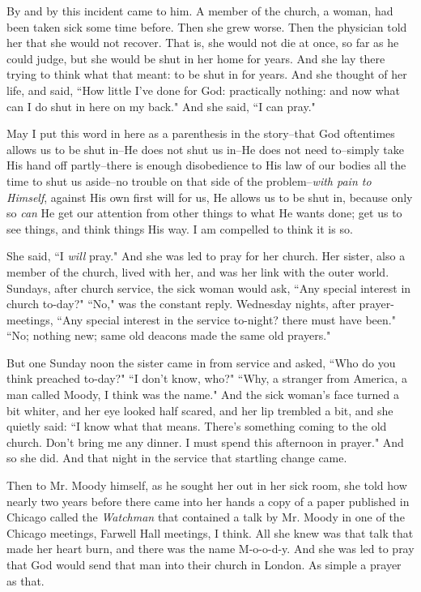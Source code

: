 By and by this incident came to him. A member of the church, a woman, had
been taken sick some time before. Then she grew worse. Then the physician
told her that she would not recover. That is, she would not die at once,
so far as he could judge, but she would be shut in her home for years.
And she lay there trying to think what that meant: to be shut in for
years. And she thought of her life, and said, ``How little I've done for
God: practically nothing: and now what can I do shut in here on my back."
And she said, ``I can pray."

May I put this word in here as a parenthesis in the story--that God
oftentimes allows us to be shut in--He does not shut us in--He does not
need to--simply take His hand off partly--there is enough disobedience to
His law of our bodies all the time to shut us aside--no trouble on that
side of the problem--\textit{with pain to Himself}, against His own first will
for us, He allows us to be shut in, because only so \textit{can} He get our
attention from other things to what He wants done; get us to see things,
and think things His way. I am compelled to think it is so.

She said, ``I \textit{will} pray." And she was led to pray for her church. Her
sister, also a member of the church, lived with her, and was her link with
the outer world. Sundays, after church service, the sick woman would ask,
``Any special interest in church to-day?" ``No," was the constant reply.
Wednesday nights, after prayer-meetings, ``Any special interest in the
service to-night? there must have been." ``No; nothing new; same old
deacons made the same old prayers."

But one Sunday noon the sister came in from service and asked, ``Who do you
think preached to-day?" ``I don't know, who?" ``Why, a stranger from
America, a man called Moody, I think was the name." And the sick woman's
face turned a bit whiter, and her eye looked half scared, and her lip
trembled a bit, and she quietly said: ``I know what that means. There's
something coming to the old church. Don't bring me any dinner. I must
spend this afternoon in prayer." And so she did. And that night in the
service that startling change came.

Then to Mr. Moody himself, as he sought her out in her sick room, she told
how nearly two years before there came into her hands a copy of a paper
published in Chicago called the \textit{Watchman} that contained a talk by Mr.
Moody in one of the Chicago meetings, Farwell Hall meetings, I think. All
she knew was that talk that made her heart burn, and there was the name
M-o-o-d-y. And she was led to pray that God would send that man into their
church in London. As simple a prayer as that.

